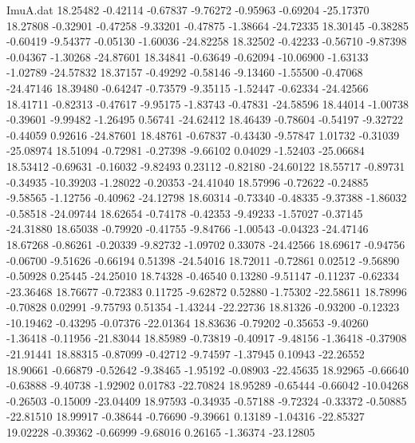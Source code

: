 \begin{filecontents}{ImuA.dat}
  18.25482   -0.42114   -0.67837   -9.76272   -0.95963   -0.69204  -25.17370
  18.27808   -0.32901   -0.47258   -9.33201   -0.47875   -1.38664  -24.72335
  18.30145   -0.38285   -0.60419   -9.54377   -0.05130   -1.60036  -24.82258
  18.32502   -0.42233   -0.56710   -9.87398   -0.04367   -1.30268  -24.87601
  18.34841   -0.63649   -0.62094  -10.06900   -1.63133   -1.02789  -24.57832
  18.37157   -0.49292   -0.58146   -9.13460   -1.55500   -0.47068  -24.47146
  18.39480   -0.64247   -0.73579   -9.35115   -1.52447   -0.62334  -24.42566
  18.41711   -0.82313   -0.47617   -9.95175   -1.83743   -0.47831  -24.58596
  18.44014   -1.00738   -0.39601   -9.99482   -1.26495    0.56741  -24.62412
  18.46439   -0.78604   -0.54197   -9.32722   -0.44059    0.92616  -24.87601
  18.48761   -0.67837   -0.43430   -9.57847    1.01732   -0.31039  -25.08974
  18.51094   -0.72981   -0.27398   -9.66102    0.04029   -1.52403  -25.06684
  18.53412   -0.69631   -0.16032   -9.82493    0.23112   -0.82180  -24.60122
  18.55717   -0.89731   -0.34935  -10.39203   -1.28022   -0.20353  -24.41040
  18.57996   -0.72622   -0.24885   -9.58565   -1.12756   -0.40962  -24.12798
  18.60314   -0.73340   -0.48335   -9.37388   -1.86032   -0.58518  -24.09744
  18.62654   -0.74178   -0.42353   -9.49233   -1.57027   -0.37145  -24.31880
  18.65038   -0.79920   -0.41755   -9.84766   -1.00543   -0.04323  -24.47146
  18.67268   -0.86261   -0.20339   -9.82732   -1.09702    0.33078  -24.42566
  18.69617   -0.94756   -0.06700   -9.51626   -0.66194    0.51398  -24.54016
  18.72011   -0.72861    0.02512   -9.56890   -0.50928    0.25445  -24.25010
  18.74328   -0.46540    0.13280   -9.51147   -0.11237   -0.62334  -23.36468
  18.76677   -0.72383    0.11725   -9.62872    0.52880   -1.75302  -22.58611
  18.78996   -0.70828    0.02991   -9.75793    0.51354   -1.43244  -22.22736
  18.81326   -0.93200   -0.12323  -10.19462   -0.43295   -0.07376  -22.01364
  18.83636   -0.79202   -0.35653   -9.40260   -1.36418   -0.11956  -21.83044
  18.85989   -0.73819   -0.40917   -9.48156   -1.36418   -0.37908  -21.91441
  18.88315   -0.87099   -0.42712   -9.74597   -1.37945    0.10943  -22.26552
  18.90661   -0.66879   -0.52642   -9.38465   -1.95192   -0.08903  -22.45635
  18.92965   -0.66640   -0.63888   -9.40738   -1.92902    0.01783  -22.70824
  18.95289   -0.65444   -0.66042  -10.04268   -0.26503   -0.15009  -23.04409
  18.97593   -0.34935   -0.57188   -9.72324   -0.33372   -0.50885  -22.81510
  18.99917   -0.38644   -0.76690   -9.39661    0.13189   -1.04316  -22.85327
  19.02228   -0.39362   -0.66999   -9.68016    0.26165   -1.36374  -23.12805

\end{filecontents}
